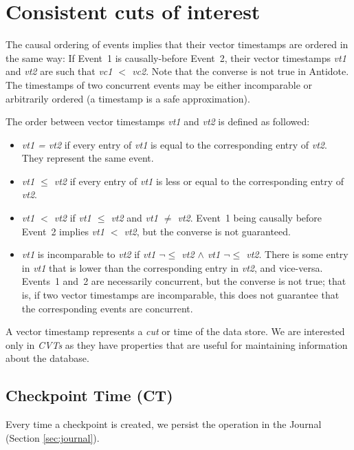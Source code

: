 \documentclass[twoside]{article}
\begin{document}
\section{Consistent cuts of interest}
\label{sec:tcc-cuts}
The causal ordering of events implies that their vector timestamps are
ordered in the same way:
If Event~1 is causally-before Event~2, their vector timestamps
\emph{vt1} and \emph{vt2} are such that 
\emph{vc1 $<$ vc2}.
Note that the converse is not true in Antidote.
The timestamps of two
concurrent events may be either incomparable or arbitrarily ordered (a
timestamp is a safe approximation).

The order between vector timestamps \emph{vt1} and \emph{vt2} is defined
as followed:
\begin{itemize}
\item
  \emph{vt1 = vt2} if every entry of \emph{vt1} is equal to the
  corresponding entry of \emph{vt2}.
  They represent the same event.
\item
  \emph{vt1 $\le$ vt2} if every entry of \emph{vt1} is less or equal to
  the corresponding entry of \emph{vt2}.
\item
  \emph{vt1 $<$ vt2} if \emph{vt1 $\le$ vt2} and \emph{vt1 $\neq$ vt2}.
  Event~1 being causally before Event~2 implies \emph{vt1 $<$ vt2}, but the converse
  is not guaranteed.
\item
  \emph{vt1} is incomparable to \emph{vt2} if \emph{vt1 $\neg\le$ vt2
    $\land$ vt1 $\neg\le$ vt2}.
  There is some entry in \emph{vt1} that is lower than the
  corresponding entry in \emph{vt2}, and vice-versa.
  Events~1 and~2 are necessarily concurrent, but the converse is not true;
  that is, if two vector timestamps are incomparable, this does not guarantee
  that the corresponding events are concurrent.
\end{itemize}
A vector timestamp represents a \emph{cut} or time of the data store.
We are interested only in \emph{CVTs} as they have properties that are 
useful for maintaining information about the database.


\subsection{Checkpoint Time (CT)}
\label{sec:checkpoint-time}
Every time a checkpoint is created, we persist the operation in the Journal
(Section \ref{sec:journal}).
\end{document}
